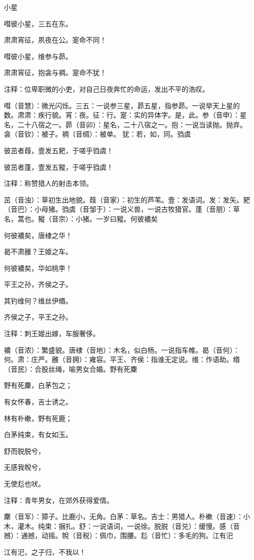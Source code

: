 \documentclass[12pt,UTF8]{ctexbook}
\begin{document}
小星

嘒彼小星，三五在东。

肃肃宵征，夙夜在公。寔命不同！

嘒彼小星，维参与昴。

肃肃宵征，抱衾与裯。寔命不犹！

注释：位卑职微的小吏，对自己日夜奔忙的命运，发出不平的浩叹。

嘒（音慧）：微光闪烁。三五：一说参三星，昴五星，指参昴。一说举天上星的数。肃肃：疾行貌。宵：夜。征：行。寔：实的异体字。是，此。参（音申）：星名，二十八宿之一。昴（音卯）：星名，二十八宿之一。抱：一说当读抛。抛弃。衾（音钦）：被子。裯（音绸）：被单。 犹：若，如，同。驺虞 

彼茁者葭，壹发五豝，于嗟乎驺虞！

彼茁者蓬，壹发五豵，于嗟乎驺虞！

注释：称赞猎人的射击本领。

茁（音浊）：草初生出地貌。葭（音家）：初生的芦苇。壹：发语词。发：发矢。豝（音巴）：小母猪。驺虞（音邹于）：一说义兽，一说古牧猎官。蓬（音朋）：草名，蒿也。豵（音宗）：小猪。一岁曰豵。何彼襛矣 

何彼襛矣，唐棣之华！

曷不肃雝？王姬之车。

何彼襛矣，华如桃李！

平王之孙，齐侯之子。

其钓维何？维丝伊缗。

齐侯之子，平王之孙。

注释：刺王姬出嫁，车服奢侈。

襛（音浓）：繁盛貌。唐棣（音地）：木名，似白杨。一说指车帷。曷（音何）：何。肃：庄严。雝（音拥）：雍容。平王、齐侯：指谁无定说。维：作语助。缗（音民）：合股丝绳，喻男女合婚。野有死麇

野有死麇，白茅包之；

有女怀春，吉士诱之。

林有朴樕，野有死鹿；

白茅纯束，有女如玉。

舒而脱脱兮，

无感我帨兮，

无使尨也吠。

注释：青年男女，在郊外获得爱情。

麇（音军）：獐子。比鹿小，无角。白茅：草名。吉士：男猎人。朴樕（音速）：小木，灌木。纯束：捆扎。舒：一说语词，一说徐。脱脱（音兑）：缓慢。感（音撼）：通撼，动摇。帨（音税）：佩巾，围腰。尨（音忙）：多毛的狗。江有汜

江有汜，之子归，不我以！
\end{document}
